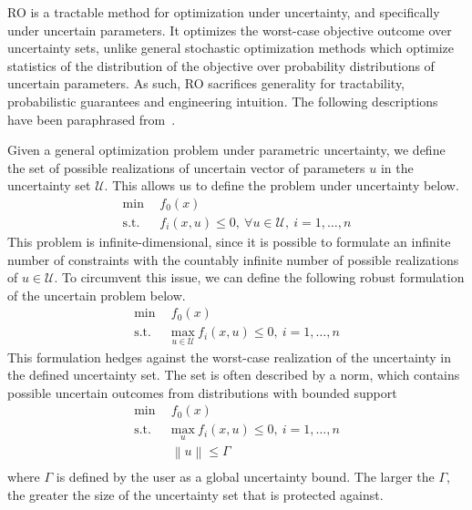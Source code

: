\documentclass[journal]{new-aiaa}
\begin{document}
RO is a tractable method for optimization under uncertainty, and specifically under uncertain
parameters. It optimizes the worst-case objective outcome over uncertainty sets,
unlike general stochastic optimization methods which optimize statistics of the distribution
of the objective over probability distributions of uncertain parameters. As such, RO
sacrifices generality for tractability, probabilistic guarantees and engineering intuition. The following
descriptions have been paraphrased from~\cite{Ozturk2019}.

Given a general optimization problem under parametric uncertainty, we define the set of possible
realizations of uncertain vector of parameters $u$ in the uncertainty set $\mathcal{U}$. This
allows us to define the problem under uncertainty below.
\begin{align*}
    \text{min} &~~f_0(x) \\
    \text{s.t.}     &~~f_i(x,u) \leq 0,~\forall u \in \mathcal{U},~i = 1,\ldots,n
\end{align*}
This problem is infinite-dimensional, since it is possible to formulate an infinite number of constraints
with the countably infinite number of possible realizations of $u \in \mathcal{U}$. To circumvent this issue,
we can define the following robust formulation of the uncertain problem below.
\begin{align*}
    \text{min} &~~f_0(x) \\
    \text{s.t.}     &~~\underset{u \in \mathcal{U}}{\text{max}}~f_i(x,u) \leq 0,~i = 1,\ldots,n
\end{align*}
This formulation hedges against the worst-case realization of the uncertainty in the defined uncertainty
set. The set is often described by a norm, which contains possible uncertain outcomes from distributions with
bounded support
\begin{equation}
    \begin{split}
        \text{min} &~~f_0(x) \\
    \text{s.t.}     &~~\underset{u}{\text{max}}~f_i(x,u) \leq 0,~i = 1,\ldots,n \\
                    &~~\left\lVert u \right\rVert \leq \Gamma \\
        \end{split}
    \label{eq:normform}
\end{equation}
where $\Gamma$ is defined by the user as a global uncertainty bound. The larger the $\Gamma$,
the greater the size of the uncertainty set that is protected against.
\end{document}
